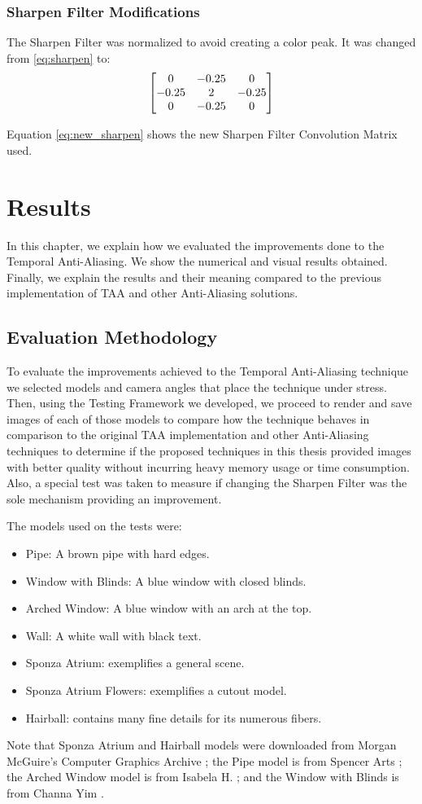 \documentclass{cslthse-msc}
\begin{document}
\subsection{Sharpen Filter Modifications}
The Sharpen Filter was normalized to avoid creating a color peak. It was changed from \ref{eq:sharpen} to:
\begin{equation} \label{eq:new_sharpen}
\centering
\begin{bmatrix*}[c]
0 & -0.25 &  0 \\
-0.25  &  2 & -0.25  \\
0 & -0.25  &  0
\end{bmatrix*}
\end{equation}

Equation \ref{eq:new_sharpen} shows the new Sharpen Filter Convolution Matrix used.


\chapter{Results}
In this chapter, we explain how we evaluated the improvements done to the Temporal Anti-Aliasing. We show the numerical and visual results obtained. Finally, we explain the results and their meaning compared to the previous implementation of TAA and other Anti-Aliasing solutions.
\section{Evaluation Methodology}
To evaluate the improvements achieved to the Temporal Anti-Aliasing technique we selected models and camera angles that place the technique under stress. Then, using the Testing Framework we developed, we proceed to render and save images of each of those models to compare how the technique behaves in comparison to the original TAA implementation and other Anti-Aliasing techniques to determine if the proposed techniques in this thesis provided images with better quality without incurring heavy memory usage or time consumption. Also, a special test was taken to measure if changing the Sharpen Filter was the sole mechanism providing an improvement.

The models used on the tests were:
\begin{itemize}
\item Pipe: A brown pipe with hard edges.
\item Window with Blinds: A blue window with closed blinds.
\item Arched Window: A blue window with an arch at the top.
\item Wall: A white wall with black text.
\item Sponza Atrium: exemplifies a general scene.
\item Sponza Atrium Flowers: exemplifies a cutout model.
\item Hairball: contains many fine details for its numerous fibers.
\end{itemize}
Note that Sponza Atrium and Hairball models were downloaded from Morgan McGuire's Computer Graphics Archive \cite{McGuire2017Data}; the Pipe model is from Spencer Arts \cite{Spencer2010}; the Arched Window model is from Isabela H. \cite{Isabela2016}; and the Window with Blinds is from Channa Yim \cite{Channa2015}.
\end{document}
